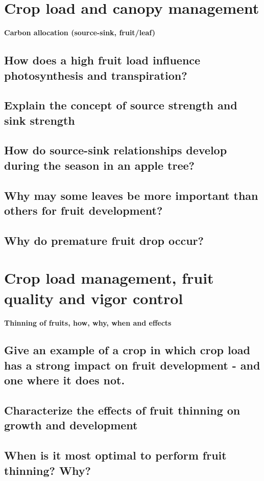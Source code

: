\vspace{1em}
\section{Crop load and canopy management}
\textbf{Carbon allocation (source-sink, fruit/leaf)}

\subsection{How does a high fruit load influence photosynthesis and transpiration?}
\subsection{Explain the concept of source strength and sink strength}
\subsection{How do source-sink relationships develop during the season in an apple 
tree?}
\subsection{Why may some leaves be more important than others for fruit 
development?}
\subsection{Why do premature fruit drop occur?}


\vspace{1em}
\section{Crop load management, fruit quality and vigor control}
\textbf{Thinning of fruits, how, why, when and effects}

\subsection{Give an example of a crop in which crop load has a strong impact on fruit development - and one where it does not.}
\subsection{Characterize the effects of fruit thinning on growth and development}
\subsection{When is it most optimal to perform fruit thinning? Why?}
